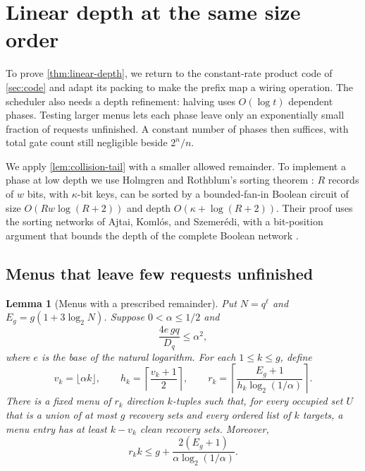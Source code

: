 \documentclass[11pt]{article}
\newtheorem{lemma}[lemma]{Lemma}
\begin{document}
\section{Linear depth at the same size order}\label{sec:linear-depth}

To prove \cref{thm:linear-depth}, we return to the constant-rate product
code of \cref{sec:code} and adapt its packing to make the prefix map a
wiring operation.  The scheduler also needs a depth refinement: halving
uses $O(\log t)$ dependent phases.  Testing larger menus lets each phase
leave only an exponentially small fraction of requests unfinished.
A constant number of phases then suffices, with total gate count still
negligible beside $2^n/n$.

We apply \cref{lem:collision-tail} with a smaller allowed remainder.
To implement a phase at low depth we use
Holmgren and Rothblum's sorting theorem
\cite[Lemma~6]{HolmgrenRothblum2024}: $R$ records of $w$ bits, with
$\kappa$-bit keys, can be sorted by a bounded-fan-in Boolean circuit of size
$O(Rw\log(R+2))$ and depth $O(\kappa+\log(R+2))$.
Their proof uses the sorting networks of Ajtai, Koml\'os, and Szemer\'edi,
with a bit-position argument that bounds the depth of the complete Boolean
network \cite[Section~4]{HolmgrenRothblum2024}.

\subsection{Menus that leave few requests unfinished}

\begin{lemma}[Menus with a prescribed remainder]\label{lem:small-remainder-menus}
Put $N=q^\ell$ and $E_g=g(1+3\log_2N)$.  Suppose $0<\alpha\le1/2$ and
\[
  \frac{4e\,gq}{D_q}\le\alpha^2,
\]
where $e$ is the base of the natural logarithm.
For each $1\le k\le g$, define
\[
  v_k=\lfloor\alpha k\rfloor,\qquad
  h_k=\left\lceil\frac{v_k+1}{2}\right\rceil,\qquad
  r_k=\left\lceil
       \frac{E_g+1}{h_k\log_2(1/\alpha)}
      \right\rceil.
\]
There is a fixed menu of $r_k$ direction $k$-tuples such that, for every
occupied set $U$ that is a union of at most $g$ recovery sets and every
ordered list of $k$ targets, a menu entry has at least $k-v_k$ clean
recovery sets.  Moreover,
\begin{equation}\label{eq:small-remainder-menu-work}
  r_k k\le
  g+\frac{2(E_g+1)}{\alpha\log_2(1/\alpha)}.
\end{equation}
\end{lemma}
\end{document}
